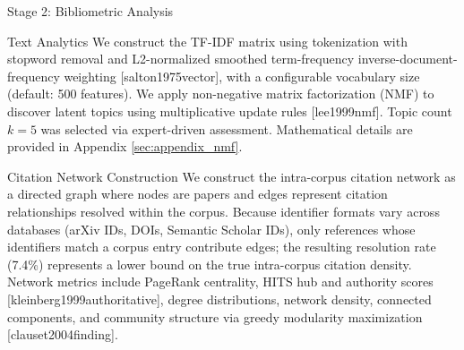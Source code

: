 \documentclass[
  ignorenonframetext,
]{beamer}
\providecommand{\citep}[1]{[#1]}
\begin{document}
\begin{frame}{Stage 2: Bibliometric Analysis
\label{sec:methods_bibliometrics}}
\begin{block}{Text Analytics}
\protect{}\label{text-analytics}
We construct the TF-IDF matrix using tokenization with stopword removal
and L2-normalized smoothed term-frequency inverse-document-frequency
weighting \citep{salton1975vector}, with a configurable vocabulary size
(default: 500 features). We apply non-negative matrix factorization
(NMF) to discover latent topics using multiplicative update rules
\citep{lee1999nmf}. Topic count \(k=5\) was selected via expert-driven
assessment. Mathematical details are provided in Appendix
\ref{sec:appendix_nmf}.
\end{block}

\begin{block}{Citation Network Construction}
\protect{}\label{citation-network-construction}
We construct the intra-corpus citation network as a directed graph where
nodes are papers and edges represent citation relationships resolved
within the corpus. Because identifier formats vary across databases
(arXiv IDs, DOIs, Semantic Scholar IDs), only references whose
identifiers match a corpus entry contribute edges; the resulting
resolution rate (7.4\%) represents a lower bound on the true
intra-corpus citation density. Network metrics include PageRank
centrality, HITS hub and authority scores
\citep{kleinberg1999authoritative}, degree distributions, network
density, connected components, and community structure via greedy
modularity maximization \citep{clauset2004finding}.
\end{block}
\end{frame}
\end{document}
